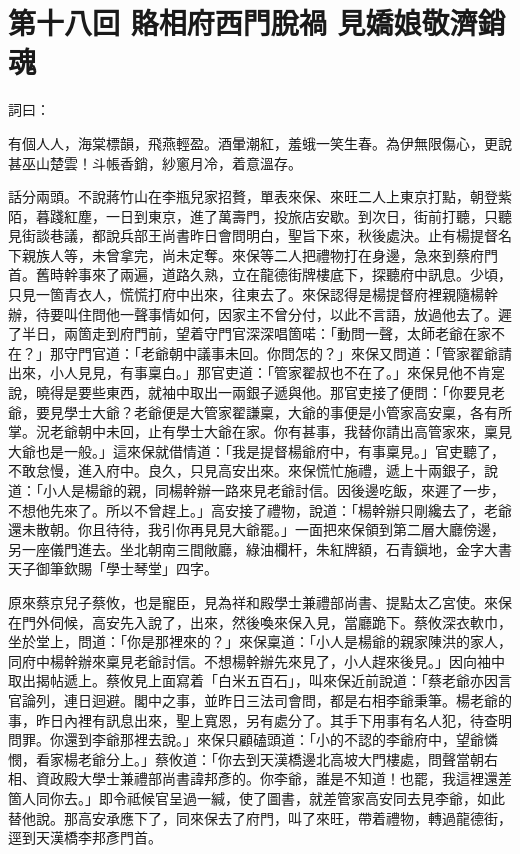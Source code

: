 
\chapter*{第十八回 賂相府西門脫禍 見嬌娘敬濟銷魂}


詞曰：

\begin{myquote}
有個人人，海棠標韻，飛燕輕盈。酒暈潮紅，羞蛾一笑生春。為伊無限傷心，更說甚巫山楚雲！斗帳香銷，紗窻月冷，着意溫存。

\end{myquote}

話分兩頭。不說蔣竹山在李瓶兒家招贅，單表來保、來旺二人上東京打點，朝登紫陌，暮踐紅塵，一日到東京，進了萬壽門，投旅店安歇。到次日，街前打聽，只聽見街談巷議，都說兵部王尚書昨日會問明白，聖旨下來，秋後處決。止有楊提督名下親族人等，未曾拿完，尚未定奪。來保等二人把禮物打在身邊，急來到蔡府門首。舊時幹事來了兩遍，道路久熟，立在龍德街牌樓底下，探聽府中訊息。少頃，只見一箇青衣人，慌慌打府中出來，往東去了。來保認得是楊提督府裡親隨楊幹辦，待要叫住問他一聲事情如何，因家主不曾分付，以此不言語，放過他去了。遲了半日，兩箇走到府門前，望着守門官深深唱箇喏：「動問一聲，太師老爺在家不在？」那守門官道：「老爺朝中議事未回。你問怎的？」來保又問道：「管家翟爺請出來，小人見見，有事稟白。」那官吏道：「管家翟叔也不在了。」來保見他不肯寔說，曉得是要些東西，就袖中取出一兩銀子遞與他。那官吏接了便問：「你要見老爺，要見學士大爺？老爺便是大管家翟謙稟，大爺的事便是小管家高安稟，各有所掌。況老爺朝中未回，{}止有學士大爺在家。你有甚事，我替你請出高管家來，稟見大爺也是一般。」這來保就借情道：「我是提督楊爺府中，有事稟見。」官吏聽了，不敢怠慢，進入府中。良久，只見高安出來。來保慌忙施禮，遞上十兩銀子，說道：「小人是楊爺的親，同楊幹辦一路來見老爺討信。因後邊吃飯，來遲了一步，不想他先來了。所以不曾趕上。」高安接了禮物，說道：「楊幹辦只剛纔去了，老爺還未散朝。你且待待，我引你再見見大爺罷。」一面把來保領到第二層大廳傍邊，另一座儀門進去。坐北朝南三間敞廳，綠油欄杆，朱紅牌額，石青鎭地，金字大書天子御筆欽賜「學士琴堂」四字。

原來蔡京兒子蔡攸，也是寵臣，見為祥和殿學士兼禮部尚書、提點太乙宮使。來保在門外伺候，高安先入說了，出來，然後喚來保入見，當廳跪下。蔡攸深衣軟巾，坐於堂上，問道：「你是那裡來的？」來保稟道：「小人是楊爺的親家陳洪的家人，同府中楊幹辦來稟見老爺討信。不想楊幹辦先來見了，小人趕來後見。」因向袖中取出揭帖遞上。蔡攸見上面寫着「白米五百石」，叫來保近前說道：「蔡老爺亦因言官論列，連日迴避。閣中之事，並昨日三法司會問，都是右相李爺秉筆。楊老爺的事，昨日內裡有訊息出來，聖上寬恩，另有處分了。其手下用事有名人犯，待查明問罪。你還到李爺那裡去說。」來保只顧磕頭道：「小的不認的李爺府中，望爺憐憫，看家楊老爺分上。」蔡攸道：「你去到天漢橋邊北高坡大門樓處，問聲當朝右相、資政殿大學士兼禮部尚書諱邦彥的。{}你李爺，誰是不知道！也罷，我這裡還差箇人同你去。」即令祗候官呈過一緘，使了圖書，就差管家高安同去見李爺，如此替他說。那高安承應下了，同來保去了府門，叫了來旺，帶着禮物，轉過龍德街，逕到天漢橋李邦彥門首。

